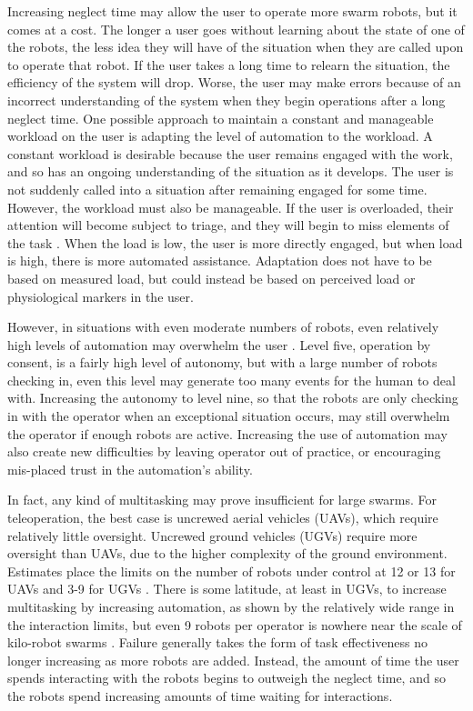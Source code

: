 \documentclass[]{article}
\begin{document}
Increasing neglect time may allow the user to operate more swarm robots, but it comes at a cost. 
The longer a user goes without learning about the state of one of the robots, the less idea they will have of the situation when they are called upon to operate that robot. 
If the user takes a long time to relearn the situation, the efficiency of the system will drop. 
Worse, the user may make errors because of an incorrect understanding of the system when they begin operations after a long neglect time. 
One possible approach to maintain a constant and manageable workload on the user is adapting the level of automation to the workload. 
A constant workload is desirable because the user remains engaged with the work, and so has an ongoing understanding of the situation as it develops. 
The user is not suddenly called into a situation after remaining engaged for some time. 
However, the workload must also be manageable. 
If the user is overloaded, their attention will become subject to triage, and they will begin to miss elements of the task . 
When the load is low, the user is more directly engaged, but when load is high, there is more automated assistance. 
Adaptation does not have to be based on measured load, but could instead be based on perceived load or physiological markers in the user. 

However, in situations with even moderate numbers of robots, even relatively high levels of automation may overwhelm the user . 
Level five, operation by consent, is a fairly high level of autonomy, but with a large number of robots checking in, even this level may generate too many events for the human to deal with. 
Increasing the autonomy to level nine, so that the robots are only checking in with the operator when an exceptional situation occurs, may still overwhelm the operator if enough robots are active.
Increasing the use of automation may also create new difficulties by leaving operator out of practice, or encouraging mis-placed trust in the automation's ability. 

In fact, any kind of multitasking may prove insufficient for large swarms. 
For teleoperation, the best case is uncrewed aerial vehicles (UAVs), which require relatively little oversight. 
Uncrewed ground vehicles (UGVs) require more oversight than UAVs, due to the higher complexity of the ground environment. 
Estimates place the limits on the number of robots under control at 12 or 13 for UAVs and 3-9 for UGVs \cite{WangSearchScale}.  
There is some latitude, at least in UGVs, to increase multitasking by increasing automation, as shown by the relatively wide range in the interaction limits, but even 9 robots per operator is nowhere near the scale of kilo-robot swarms  \cite{Olsen:2004:FMH:985692.985722}.
Failure generally takes the form of task effectiveness no longer increasing as more robots are added.
Instead, the amount of time the user spends interacting with the robots begins to outweigh the neglect time, and so the robots spend increasing amounts of time waiting for interactions. 
\end{document}
